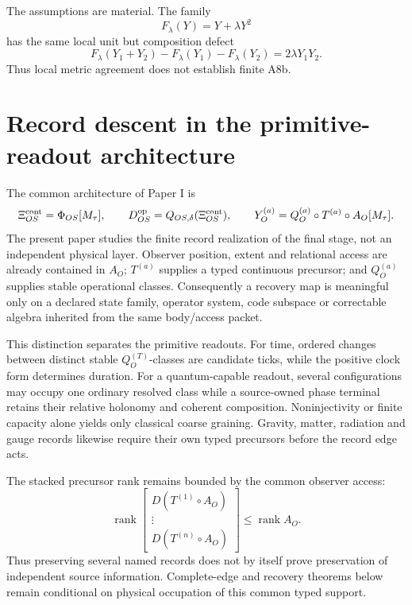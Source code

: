 \documentclass[11pt]{article}
\begin{document}
The assumptions are material.  The family
\begin{equation}
 F_\lambda(Y)=Y+\lambda Y^2
 \label{eq:nonlinear-countermodel}
\end{equation}
has the same local unit but composition defect
\begin{equation}
 F_\lambda(Y_1+Y_2)-F_\lambda(Y_1)-F_\lambda(Y_2)
 =2\lambda Y_1Y_2.
 \label{eq:nonlinear-defect}
\end{equation}
Thus local metric agreement does not establish finite A8b.

\section{Record descent in the primitive-readout architecture}

The common architecture of Paper I is
\begin{equation}
 \Xi_{OS}^{\rm cont}=\Phi_{OS}[M_\tau],
 \qquad
 D_{OS}^{\rm op}=Q_{OS,\delta}(\Xi_{OS}^{\rm cont}),
 \qquad
 Y_O^{(a)}=Q_O^{(a)}\circ T^{(a)}\circ A_O[M_\tau].
 \label{eq:mcpr-record-interface}
\end{equation}
The present paper studies the finite record realization of the final stage,
not an independent physical layer. Observer position, extent and relational
access are already contained in $A_O$; $T^{(a)}$ supplies a typed
continuous precursor; and $Q_O^{(a)}$ supplies stable operational classes.
Consequently a recovery map is meaningful only on a declared state family,
operator system, code subspace or correctable algebra inherited from the same
body/access packet.

This distinction separates the primitive readouts. For time, ordered changes
between distinct stable $Q_O^{(T)}$-classes are candidate ticks, while the
positive clock form determines duration. For a quantum-capable readout,
several configurations may occupy one ordinary resolved class while a
source-owned phase terminal retains their relative holonomy and coherent
composition. Noninjectivity or finite capacity alone yields only classical
coarse graining. Gravity, matter, radiation and gauge records likewise require
their own typed precursors before the record edge acts.

The stacked precursor rank remains bounded by the common observer access:
\begin{equation}
 \operatorname{rank}
 \begin{bmatrix}
 D(T^{(1)}\circ A_O)\\[-1mm]
 \vdots\\[-1mm]
 D(T^{(n)}\circ A_O)
 \end{bmatrix}
 \leq \operatorname{rank}A_O.
 \label{eq:mcpr-record-rank}
\end{equation}
Thus preserving several named records does not by itself prove preservation
of independent source information. Complete-edge and recovery theorems below
remain conditional on physical occupation of this common typed support.
\end{document}
